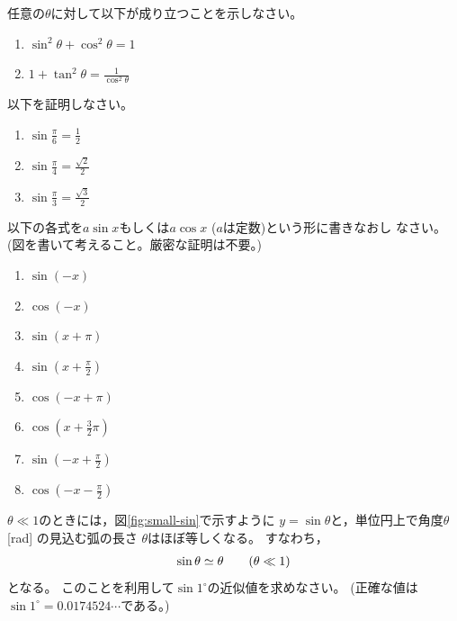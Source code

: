\documentclass[twocolumn,11pt]{jarticle}
\begin{document}
\nquestion
任意の$\theta$に対して以下が成り立つことを示しなさい。
\begin{enumerate}
\item $\sin^2\theta+\cos^2\theta=1$
\item $\displaystyle 1+\tan^2\theta=\frac{1}{\cos^2\theta}$
\end{enumerate}

\nquestion
以下を証明しなさい。
\begin{enumerate}
\item $\displaystyle\sin\frac{\pi}{6}=\frac{1}{2}$
\item $\displaystyle\sin\frac{\pi}{4}=\frac{\sqrt{2}}{2}$
\item $\displaystyle\sin\frac{\pi}{3}=\frac{\sqrt{3}}{2}$
\end{enumerate}

\nquestion
以下の各式を$a\sin x$もしくは$a\cos x$ ($a$は定数)という形に書きなおし
なさい。
(図を書いて考えること。厳密な証明は不要。)

\begin{minipage}[t]{.4\linewidth}
\begin{enumerate}
\item $\displaystyle\sin(-x)$
\item $\displaystyle\cos(-x)$
\item $\displaystyle\sin(x+\pi)$
\item $\displaystyle\sin(x+\frac{\pi}{2})$
\end{enumerate}
\end{minipage}\quad
\begin{minipage}[t]{.4\linewidth}
\begin{enumerate}
\setcounter{enumi}{4}
\item $\displaystyle\cos(-x+\pi)$
\item $\displaystyle\cos(x+\frac{3}{2}\pi)$
\item $\displaystyle\sin(-x+\frac{\pi}{2})$
\item $\displaystyle\cos(-x-\frac{\pi}{2})$
\end{enumerate}
\end{minipage}

\nquestion
$\theta\ll 1$のときには，図\ref{fig:small-sin}で示すように
$y=\sin\theta$と，単位円上で角度$\theta$ [rad] の見込む弧の長さ
$\theta$はほぼ等しくなる。
すなわち，
\begin{align}
  \sin\theta\simeq\theta\qquad (\theta\ll 1)\notag
\end{align}
となる。
このことを利用して$\sin 1^\circ$の近似値を求めなさい。
(正確な値は$\sin 1^\circ=0.0174524\cdots$である。)
\end{document}
